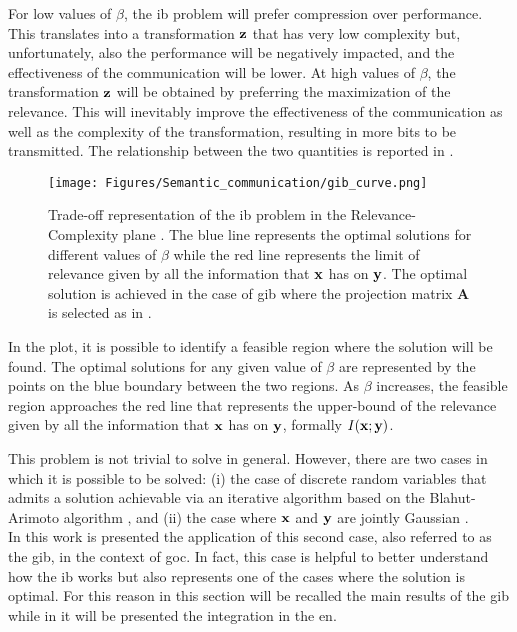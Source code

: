 For low values of $\beta$, the \gls{ib} problem will prefer compression over performance. This translates into a transformation $\mathbf{z}$ that has very low complexity but, unfortunately, also the performance will be negatively impacted, and the effectiveness of the communication will be lower. At high values of $\beta$, the transformation $\mathbf{z}$ will be obtained by preferring the maximization of the relevance. This will inevitably improve the effectiveness of the communication as well as the complexity of the transformation, resulting in more bits to be transmitted. The relationship between the two quantities is reported in .

\begin{figure}
    \centering
    \texttt{[image: Figures/Semantic\_communication/gib\_curve.png]}
    \caption[Information Bottleneck Trade-Off in the Relevance-Complexity plane]{Trade-off representation of the \acrshort{ib} problem in the Relevance-Complexity plane \cite{Zaidi2020IB}. The blue line represents the optimal solutions for different values of $\beta$ while the red line represents the limit of relevance given by all the information that $\mathbf{x}$ has on $\mathbf{y}$. The optimal solution is achieved in the case of  \acrshort{gib} where the projection matrix $\mathbf{A}$ is selected as in .}
    \label{fig: SEMCOM gib_tradeoff}
\end{figure}

In the plot, it is possible to identify a feasible region where the solution will be found. The optimal solutions for any given value of $\beta$ are represented by the points on the blue boundary between the two regions. As $\beta$ increases, the feasible region approaches the red line that represents the upper-bound of the relevance given by all the information that $\mathbf{x}$ has on $\mathbf{y}$, formally $I(\mathbf{x};\mathbf{y})$.

This problem is not trivial to solve in general. However, there are two cases in which it is possible to be solved: (i) the case of discrete random variables that admits a solution achievable via an iterative algorithm based on the Blahut-Arimoto algorithm \cite{Tishby1999IB}, and (ii) the case where $\mathbf{x}$ and $\mathbf{y}$ are jointly Gaussian \cite{Chechik2004GIB}.\\

In this work is presented the application of this second case, also referred to as the \gls{gib}, in the context of \gls{goc}. In fact, this case is helpful to better understand how the \gls{ib} works but also represents one of the cases where the solution is optimal. For this reason in this section will be recalled the main results of the \gls{gib} while in  it will be presented the integration in the \gls{en}.

